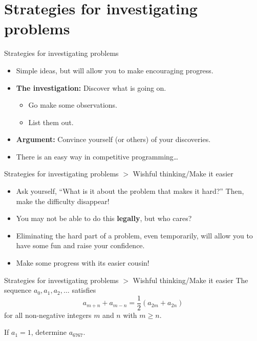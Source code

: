 \documentclass{beamer}
\begin{document}
\section{Strategies for investigating problems}

\begin{frame}{Strategies for investigating problems}
    \begin{itemize}
        \item Simple ideas, but will allow you to make encouraging progress.
        \pause
        \item \textbf{The investigation:} Discover what is going on.
        \begin{itemize}
            \item Go make some observations.
            \item List them out.
        \end{itemize}
        \pause
        \item \textbf{Argument:} Convince yourself (or others) of your discoveries.
        \pause
        \item There is an easy way in competitive programming\dots
    \end{itemize}
\end{frame}

\begin{frame}{Strategies for investigating problems $>$ Wishful thinking/Make it easier}
    \begin{itemize}
        \item Ask yourself, ``What is it about the problem that makes it hard?'' Then, make the difficulty disappear!
        \pause
        \item You may not be able to do this \textbf{legally}, but who cares?
        \pause
        \item Eliminating the hard part of a problem, even temporarily, will allow you to have some fun and raise your confidence.
        \pause
        \item Make some progress with its easier cousin!
    \end{itemize}
\end{frame}

\begin{frame}{Strategies for investigating problems $>$ Wishful thinking/Make it easier}
    The sequence $a_0, a_1, a_2, \dots$ satisfies
    \[ a_{m+n} + a_{m-n} = \frac{1}{2}(a_{2m} + a_{2n}) \]
    for all non-negative integers $m$ and $n$ with $m \ge n$.
    \pause
    \vspace{0.8em}

    If $a_1 = 1$, determine $a_{6767}$.
\end{frame}
\end{document}
